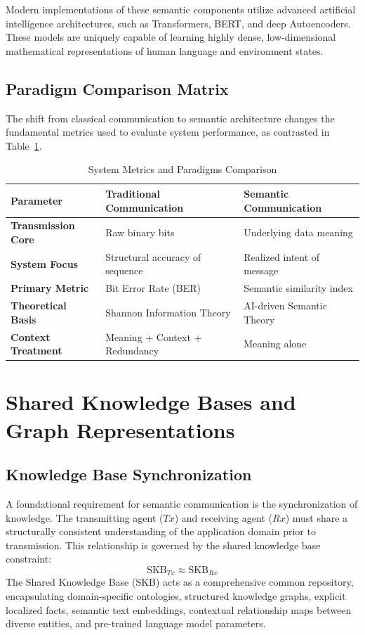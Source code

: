 \documentclass[10pt, conference]{IEEEtran}
\begin{document}
Modern implementations of these semantic components utilize advanced artificial intelligence architectures, such as Transformers, BERT, and deep Autoencoders. These models are uniquely capable of learning highly dense, low-dimensional mathematical representations of human language and environment states.

\subsection{\textbf{Paradigm Comparison Matrix}}
The shift from classical communication to semantic architecture changes the fundamental metrics used to evaluate system performance, as contrasted in Table~\ref{tab:paradigm_comparison}.

\begin{table}[h]
\centering
\caption{System Metrics and Paradigms Comparison}
\label{tab:paradigm_comparison}
\begin{tabular}{lll}
\toprule
\textbf{Parameter} & \textbf{Traditional Communication} & \textbf{Semantic Communication} \\
\midrule
\textbf{Transmission Core} & Raw binary bits & Underlying data meaning \\
\textbf{System Focus} & Structural accuracy of sequence & Realized intent of message \\
\textbf{Primary Metric} & Bit Error Rate (BER) & Semantic similarity index \\
\textbf{Theoretical Basis} & Shannon Information Theory & AI-driven Semantic Theory \\
\textbf{Context Treatment} & Meaning + Context + Redundancy & Meaning alone \\
\bottomrule
\end{tabular}
\end{table}

\section{\large \textbf{Shared Knowledge Bases and Graph Representations}}

\subsection{\textbf{Knowledge Base Synchronization}}
A foundational requirement for semantic communication is the synchronization of knowledge. The transmitting agent ($Tx$) and receiving agent ($Rx$) must share a structurally consistent understanding of the application domain prior to transmission. This relationship is governed by the shared knowledge base constraint:
\begin{equation}
    \text{SKB}_{Tx} \approx \text{SKB}_{Rx}
\end{equation}
The Shared Knowledge Base (SKB) acts as a comprehensive common repository, encapsulating domain-specific ontologies, structured knowledge graphs, explicit localized facts, semantic text embeddings, contextual relationship maps between diverse entities, and pre-trained language model parameters.
\end{document}

